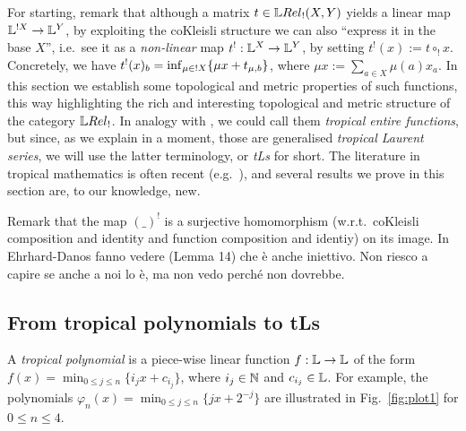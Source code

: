 For starting, remark that although a matrix $t\in\HOM{\LREL_!}{X}{Y}$ yields a linear map $\mathbb{L}^{!X}\to\mathbb{L}^Y$, by exploiting the coKleisli structure we can also ``express it in the base $X$'', i.e.\ see it as a \emph{non-linear} map $t^!:\mathbb{L}^X\to\mathbb{L}^Y$, by setting $t^!(x):=t\circ_! x$. %
Concretely, we have $t^!(x)_b=\inf_{\mu\in !X} \{\mu x+ t_{\mu,b}\}$, where $\mu x:=\sum_{a\in X} \mu(a)x_a$.
In this section we establish some topological and metric properties of such functions, this way highlighting the rich and interesting topological and metric structure of the category $\LREL_{!}$.
In analogy with \cite{DanEhrh2011}, we could call them \emph{tropical entire functions}, but since, as we explain in a moment, those are generalised \emph{tropical Laurent series}, we will use the latter terminology, or \emph{tLs} for short.
The literature in tropical mathematics is often recent (e.g.~\cite{Porzio2021}), and several results we prove in this section are, to our knowledge, new.

Remark that the map $(\_)^!$ is a surjective homomorphism (w.r.t.\ coKleisli composition and identity and function composition and identiy) on its image. {\color{red}In Ehrhard-Danos fanno vedere (Lemma 14) che \`e anche iniettivo. Non riesco a capire se anche a noi lo \`e, ma non vedo perch\'e non dovrebbe.}

%

\subsection{From tropical polynomials to tLs}\label{sec:4A}

A \emph{tropical polynomial} is a piece-wise linear function $f:\mathbb{L}\to \mathbb{L}$ of the form $f(x)=\min_{0\leq j\leq n}\{i_{j}x+c_{i_{j}}\}$, where $i_{j}\in\mathbb{N}$ and $c_{i_{j}}\in\mathbb{L}$.
For example, the polynomials $\varphi_{n}(x)=\min_{0\leq j\leq n}\{jx+2^{-j}\}$
are illustrated in Fig.~\ref{fig:plot1} for $0\leq n \leq 4$.

